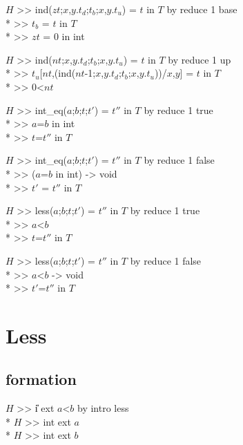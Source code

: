 \goalskip

\goal $H$ >> ind($zt$;$x$,$y$.$t_d$;$t_b$;$x$,$y$.$t_u$) = $t$ in $T$
          by reduce 1 base \\*
\subgoal >> $t_b$ = $t$ in $T$ \\*
\subgoal >> $zt$ = 0 in int

\goalskip

\goal $H$ >> ind($nt$;$x$,$y$.$t_d$;$t_b$;$x$,$y$.$t_u$) = $t$ in $T$
           by reduce 1 up \\*
\subgoal >> $t_u$[$nt$,(ind($nt$-1;$x$,$y$.$t_d$;$t_b$;$x$,$y$.$t_u$))/$x$,$y$] = $t$ in $T$ \\*
\subgoal >> 0<$nt$

\goalskip

\goalgroup $H$ >> int\_eq($a$;$b$;$t$;$t'$) = $t''$ in $T$ by reduce 1 true \\*
\subgoal >> $a$=$b$ in int \\*
\subgoal >> $t$=$t''$ in $T$

\goalskip

\goal $H$ >> int\_eq($a$;$b$;$t$;$t'$) = $t''$ in $T$ by reduce 1 false \\*
\subgoal >> ($a$=$b$ in int) -> void \\*
\subgoal >> $t'$ = $t''$ in $T$

\goalskip

\goalgroup $H$ >> less($a$;$b$;$t$;$t'$) = $t''$ in $T$ by reduce 1 true \\*
\subgoal >> $a$<$b$  \\*
\subgoal >> $t$=$t''$ in $T$

\goalskip

\goal $H$ >> less($a$;$b$;$t$;$t'$) = $t''$ in $T$ by reduce 1 false \\*
\subgoal >> $a$<$b$ -> void \\*
\subgoal >> $t'$=$t''$ in $T$

\par


\section{Less}
\subsection*{formation}
\goal $H$ >> \U{i} ext $a$<$b$ by intro less \\*
\subgoal $H$ >> int ext $a$\\*
\subgoal $H$ >> int ext $b$


